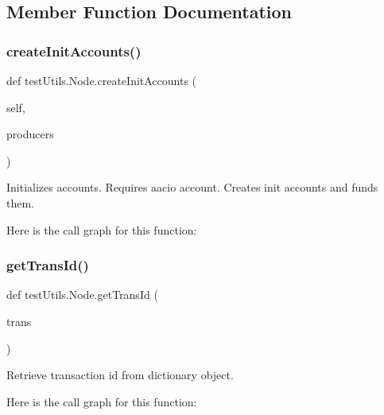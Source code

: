 \subsection{Member Function Documentation}
\mbox{\label{classtest_utils_1_1_node_a45c2532f2f74347271c884c157eace3f}} 
\subsubsection{\texorpdfstring{create\+Init\+Accounts()}{createInitAccounts()}}
{\footnotesize\ttfamily def test\+Utils.\+Node.\+create\+Init\+Accounts (\begin{DoxyParamCaption}\item[{}]{self,  }\item[{}]{producers }\end{DoxyParamCaption})}

\begin{DoxyVerb}Initializes accounts. Requires aacio account. Creates init accounts and funds them.\end{DoxyVerb}
 Here is the call graph for this function\+:
\mbox{\label{classtest_utils_1_1_node_ae532544a53c9e9b8afe53cc04cb9f8a5}} 
\subsubsection{\texorpdfstring{get\+Trans\+Id()}{getTransId()}}
{\footnotesize\ttfamily def test\+Utils.\+Node.\+get\+Trans\+Id (\begin{DoxyParamCaption}\item[{}]{trans }\end{DoxyParamCaption})\hspace{0.3cm}{\ttfamily [static]}}

\begin{DoxyVerb}Retrieve transaction id from dictionary object.\end{DoxyVerb}
 Here is the call graph for this function\+:
\mbox{\label{classtest_utils_1_1_node_a32b34acdb7d8e016235fd84ce3045311}} 
